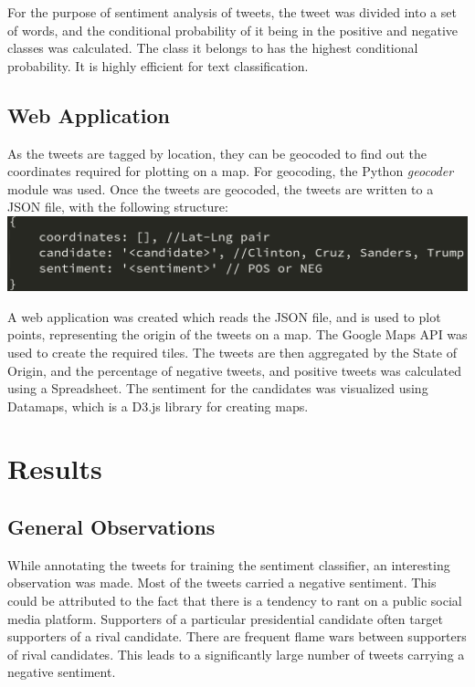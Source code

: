 \documentclass[twoside]{article}
\begin{document}
\begin{multicols}{2}
For the purpose of sentiment analysis of tweets, the tweet was divided into a set of words, and the conditional probability of it being in the positive and negative classes was calculated. The class it belongs to has the highest conditional probability. It is highly efficient for text classification.

\subsection{Web Application}
As the tweets are tagged by location, they can be geocoded to find out the coordinates required for plotting on a map. For geocoding, the Python \textit{geocoder} module \cite{geocoder} was used. Once the tweets are geocoded, the tweets are written to a JSON file, with the following structure: \\

\includegraphics[width=1\columnwidth]{json}

A web application was created which reads the JSON\cite{json} file, and is used to plot points, representing the origin of the tweets on a map. The Google Maps API\cite{GMaps} was used to create the required tiles. The tweets are then aggregated by the State of Origin, and the percentage of negative tweets, and positive tweets was calculated using a Spreadsheet. The sentiment for the candidates was visualized using Datamaps\cite{datamaps}, which is a D3.js\cite{d3} library for creating maps.

\section{Results}

\subsection{General Observations}
While annotating the tweets for training the sentiment classifier, an interesting observation was made. Most of the tweets carried a negative sentiment. This could be attributed to the fact that there is a tendency to rant on a public social media platform. Supporters of a particular presidential candidate often target supporters of a rival candidate. There are frequent flame wars between supporters of rival candidates. This leads to a significantly large number of tweets carrying a negative sentiment. \\


\end{multicols}
\end{document}
